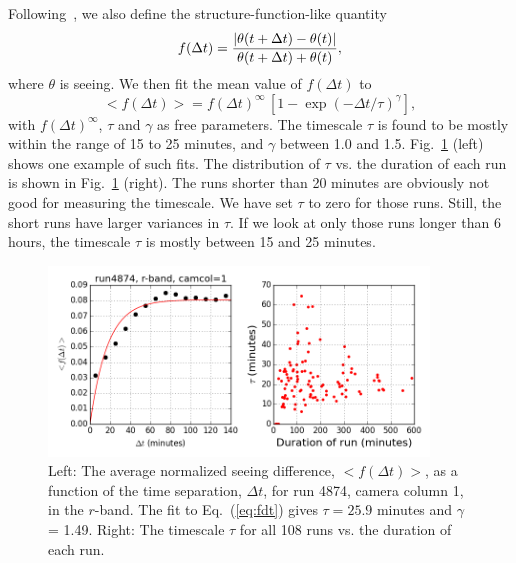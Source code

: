Following~\cite{Racine1996}, we also define the structure-function-like quantity
\begin{equation}
       f(\Delta t) = {| \theta(t+\Delta t) - \theta(t)| \over  \theta(t+\Delta t) + \theta(t) },
\end{equation} 
where $\theta$ is seeing.
We then fit the mean value of $f(\Delta t)$ to 
\begin{equation}
    < f(\Delta t) > =  f(\Delta t) ^\infty \, \left[ 1 - \exp(-\Delta
      t/\tau)^\gamma \right],
\label{eq:fdt}
\end{equation} 
with $f(\Delta t) ^\infty$, $\tau$ and $\gamma$ as free parameters.
The timescale $\tau$ is found to be mostly within the range of 15 to
25 minutes, and $\gamma$ between 1.0 and 1.5.
Fig.~\ref{fig:fdt} (left) shows one example of such fits.
The distribution of $\tau$ vs. the duration of each
run is shown in Fig.~\ref{fig:fdt} (right). The runs shorter than 20
minutes are obviously not good for measuring the timescale. We have
set $\tau$ to zero for those runs.
Still, the short runs have larger variances in $\tau$.
If we look at only those runs longer than 6 hours,
the timescale $\tau$ is mostly between 15 and 25 minutes.

\begin{figure}
\centering
\includegraphics[width=0.9\textwidth]{FIGURES/fdt.png}
\caption{Left: The average normalized seeing difference, $<f(\Delta t)>$, as
  a function of the time separation, $\Delta t$, for run 4874, camera
  column 1, in the $r$-band.
The fit to Eq.~(\ref{eq:fdt}) gives $\tau = 25.9$ minutes and $\gamma$
= 1.49.
Right: The timescale $\tau$ for all 108 runs vs. the duration of each run.
\label{fig:fdt}}
\end{figure}
